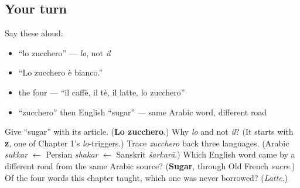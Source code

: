 \subsection*{Your turn}
Say these aloud:

\begin{itemize}
\raggedright
  \item \textquotedblleft{}lo zucchero\textquotedblright{} — \emph{lo}, not \emph{il}
  \item \textquotedblleft{}Lo zucchero è bianco.\textquotedblright{}
  \item the four — \textquotedblleft{}il caffè, il tè, il latte, lo zucchero\textquotedblright{}
  \item \textquotedblleft{}zucchero\textquotedblright{} then English \textquotedblleft{}sugar\textquotedblright{} — same Arabic word, different road
\end{itemize}

\begin{tcolorbox}[breakable,colback=teal!4,colframe=teal!35!black,title={Before you move on}]
Give \textquotedblleft{}sugar\textquotedblright{} with its article. (\textbf{Lo zucchero}.) Why \emph{lo} and not \emph{il}? (It starts with \textbf{z}, one of Chapter 1's \emph{lo}-triggers.) Trace \emph{zucchero} back three languages. (Arabic \emph{sukkar} $\leftarrow$ Persian \emph{shakar} $\leftarrow$ Sanskrit \emph{śarkarā}.) Which English word came by a different road from the same Arabic source? (\textbf{Sugar}, through Old French \emph{sucre}.) Of the four words this chapter taught, which one was never borrowed? (\emph{Latte}.)
\end{tcolorbox}
